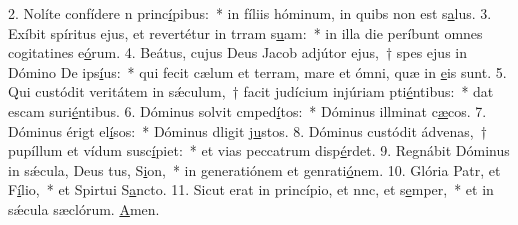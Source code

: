 2. Nolíte confídere n princ\uline{í}pibus:~* in fíliis hóminum, in quibs non est s\uline{a}lus.
3. Exíbit spíritus ejus, et revertétur in trram s\uline{u}am:~* in illa die períbunt omnes cogitatines e\uline{ó}rum.
4. Beátus, cujus Deus Jacob adjútor ejus,~† spes ejus in Dómino De ips\uline{í}us:~* qui fecit cælum et terram, mare et ómni, quæ in \uline{e}is sunt.
5. Qui custódit veritátem in sǽculum,~† facit judícium injúriam pti\uline{é}ntibus:~* dat escam suri\uline{é}ntibus.
6. Dóminus solvit cmped\uline{í}tos:~* Dóminus illminat c\uline{æ}cos.
7. Dóminus érigt el\uline{í}sos:~* Dóminus dligit j\uline{u}stos.
8. Dóminus custódit ádvenas,~† pupíllum et vídum susc\uline{í}piet:~* et vias peccatrum disp\uline{é}rdet.
9. Regnábit Dóminus in sǽcula, Deus tus, S\uline{i}on,~* in generatiónem et genrati\uline{ó}nem.
10. Glória Patr, et F\uline{í}lio,~* et Spirtui S\uline{a}ncto.
11. Sicut erat in princípio, et nnc, et s\uline{e}mper,~* et in sǽcula sæclórum. \uline{A}men.
